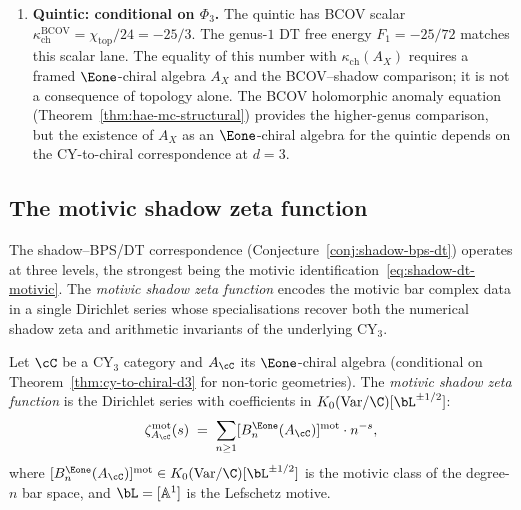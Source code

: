 \begin{remark}
\begin{enumerate}[label=\textup{(\alph*)}]
\item \textbf{Quintic: conditional on $\Phi_3$.}
The quintic has BCOV scalar $\kappa_{\mathrm{ch}}^{\mathrm{BCOV}}=\chi_{\mathrm{top}}/24=-25/3$. The genus-$1$ DT free energy $F_1=-25/72$ matches this scalar lane. The equality of this number with $\kappa_{\mathrm{ch}}(A_X)$ requires a framed $\Eone$-chiral algebra $A_X$ and the BCOV--shadow comparison; it is not a consequence of topology alone. The BCOV holomorphic anomaly equation (Theorem~\ref{thm:hae-mc-structural}) provides the higher-genus comparison, but the existence of $A_X$ as an $\Eone$-chiral algebra for the quintic depends on the CY-to-chiral correspondence at $d = 3$.

\end{enumerate}
\end{remark}


\subsection{The motivic shadow zeta function}
\label{subsec:motivic-shadow-zeta}

The shadow--BPS/DT correspondence (Conjecture~\ref{conj:shadow-bps-dt}) operates at three levels, the strongest being the motivic identification~\eqref{eq:shadow-dt-motivic}. The \emph{motivic shadow zeta function} encodes the motivic bar complex data in a single Dirichlet series whose specialisations recover both the numerical shadow zeta and arithmetic invariants of the underlying CY$_3$.

\begin{definition}
\label{def:motivic-shadow-zeta}
Let $\cC$ be a CY$_3$ category and $A_\cC$ its $\Eone$-chiral algebra (conditional on Theorem~\ref{thm:cy-to-chiral-d3} for non-toric geometries). The \emph{motivic shadow zeta function} is the Dirichlet series with coefficients in $K_0(\mathrm{Var}/\C)[\bL^{\pm 1/2}]$:
\begin{equation}
\label{eq:motivic-shadow-zeta}
 \zeta_{A_\cC}^{\mathrm{mot}}(s) \;=\; \sum_{n \geq 1} [B_n^{\Eone}(A_\cC)]^{\mathrm{mot}} \cdot n^{-s},
\end{equation}
where $[B_n^{\Eone}(A_\cC)]^{\mathrm{mot}} \in K_0(\mathrm{Var}/\C)[\bL^{\pm 1/2}]$ is the motivic class of the degree-$n$ bar space, and $\bL = [\mathbb{A}^1]$ is the Lefschetz motive.
\end{definition}

